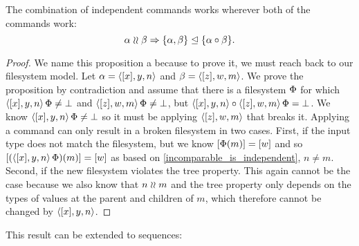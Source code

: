 \begin{myax}\label{combine_independent_commands}
The combination of independent commands works wherever both of the commands work:
\[ \alpha\mathrel{\wr\wr} \beta \Rightarrow {\{\alpha, \beta\}}\trianglelefteq{\{\alpha\circ\beta\}}. \]
\end{myax}
\begin{proof}
We name this proposition a  
because to prove it, we must reach back to our filesystem model.
Let $\alpha=\langle{[x],y,n}\rangle$ and $\beta=\langle{[z],w,m}\rangle$.
We prove the proposition by contradiction and
assume that there is a filesystem $\Phi$ for which
$\langle{[x],y,n}\rangle\,\Phi\neq\bot$ and $\langle{[z],w,m}\rangle\,\Phi\neq\bot$, but
$\langle{[x],y,n}\rangle\circ \langle{[z],w,m}\rangle\,\Phi=\bot$.
We know $\langle{[x],y,n}\rangle\,\Phi\neq\bot$ so it must be applying 
$\langle{[z],w,m}\rangle$ that breaks it.
Applying a command can only result in a broken filesystem in two cases.
First, if the input type does not match the filesystem,
but we know $[\Phi(m)]=[w]$ and so
$[(\langle{[x],y,n}\rangle\,\Phi)(m)]=[w]$ as based on \cref{incomparable_is_independent}, $n\neq m$.
Second, if the new filesystem violates the tree property.
This again cannot be the case because we also know that $n\mathrel{\wr\wr} m$
and the tree property only depends on the types of values at the parent and children of $m$,
which therefore cannot be changed by $\langle{[x],y,n}\rangle$.
\end{proof}

This result can be extended to sequences:

